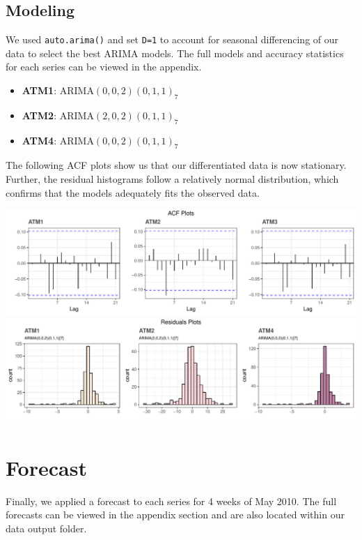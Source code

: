 \documentclass[openany]{book}
\providecommand{\tightlist}{%
  \setlength{\itemsep}{0pt}\setlength{\parskip}{0pt}}
\begin{document}
\hypertarget{modeling}{%
\subsection{Modeling}\label{modeling}}

We used \texttt{auto.arima()} and set \texttt{D=1} to account for
seasonal differencing of our data to select the best ARIMA models. The
full models and accuracy statistics for each series can be viewed in the
appendix.

\begin{itemize}
\tightlist
\item
  \textbf{ATM1}: ARIMA\((0,0,2)(0,1,1)_7\)
\item
  \textbf{ATM2}: ARIMA\((2,0,2)(0,1,1)_7\)
\item
  \textbf{ATM4}: ARIMA\((0,0,2)(0,1,1)_7\)
\end{itemize}

The following ACF plots show us that our differentiated data is now
stationary. Further, the residual histograms follow a relatively normal
distribution, which confirms that the models adequately fits the
observed data.

\includegraphics{Part-A-JM_files/figure-latex/unnamed-chunk-6-1.pdf}
\includegraphics{Part-A-JM_files/figure-latex/unnamed-chunk-6-2.pdf}

\hypertarget{forecast}{%
\section{Forecast}\label{forecast}}

Finally, we applied a forecast to each series for 4 weeks of May 2010.
The full forecasts can be viewed in the appendix section and are also
located within our data output folder.
\end{document}
